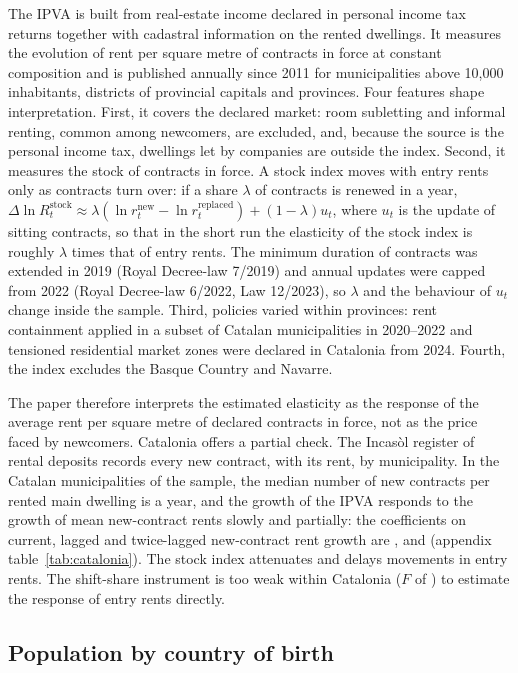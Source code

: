 \documentclass[11pt,a4paper]{article}
\begin{document}
The IPVA is built from real-estate income declared in personal income tax returns together with cadastral information on the rented dwellings. It measures the evolution of rent per square metre of contracts in force at constant composition and is published annually since 2011 for municipalities above 10,000 inhabitants, districts of provincial capitals and provinces. Four features shape interpretation. First, it covers the declared market: room subletting and informal renting, common among newcomers, are excluded, and, because the source is the personal income tax, dwellings let by companies are outside the index. Second, it measures the stock of contracts in force. A stock index moves with entry rents only as contracts turn over: if a share $\lambda$ of contracts is renewed in a year, $\Delta\ln R^{\text{stock}}_t\approx\lambda(\ln r^{\text{new}}_t-\ln r^{\text{replaced}}_t)+(1-\lambda)u_t$, where $u_t$ is the update of sitting contracts, so that in the short run the elasticity of the stock index is roughly $\lambda$ times that of entry rents. The minimum duration of contracts was extended in 2019 (Royal Decree-law 7/2019) and annual updates were capped from 2022 (Royal Decree-law 6/2022, Law 12/2023), so $\lambda$ and the behaviour of $u_t$ change inside the sample. Third, policies varied within provinces: rent containment applied in a subset of Catalan municipalities in 2020--2022 and tensioned residential market zones were declared in Catalonia from 2024. Fourth, the index excludes the Basque Country and Navarre.

The paper therefore interprets the estimated elasticity as the response of the average rent per square metre of declared contracts in force, not as the price faced by newcomers. Catalonia offers a partial check. The Incasòl register of rental deposits records every new contract, with its rent, by municipality. In the \catN{} Catalan municipalities of the sample, the median number of new contracts per rented main dwelling is \turnover{} a year, and the growth of the IPVA responds to the growth of mean new-contract rents slowly and partially: the coefficients on current, lagged and twice-lagged new-contract rent growth are \passT, \passLOne{} and \passLTwo{} (appendix table~\ref{tab:catalonia}). The stock index attenuates and delays movements in entry rents. The shift-share instrument is too weak within Catalonia ($F$ of \catF) to estimate the response of entry rents directly.

\subsection{Population by country of birth}
\end{document}
